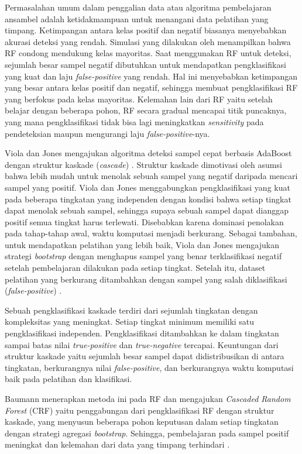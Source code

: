 Permasalahan umum dalam penggalian data atau algoritma pembelajaran ansambel
adalah ketidakmampuan untuk menangani data pelatihan yang timpang.
Ketimpangan antara kelas positif dan negatif biasanya menyebabkan akurasi
deteksi yang rendah.
Simulasi yang dilakukan oleh \textcite{strobl2007bias} menampilkan
bahwa RF condong mendukung kelas mayoritas.
Saat menggunakan RF untuk deteksi, sejumlah besar sampel negatif dibutuhkan
untuk mendapatkan pengklasifikasi yang kuat dan laju \textit{false-positive}
yang rendah.
Hal ini menyebabkan ketimpangan yang besar antara kelas positif dan
negatif, sehingga membuat pengklasifikasi RF yang berfokus pada kelas
mayoritas.
Kelemahan lain dari RF yaitu setelah belajar dengan beberapa pohon, RF secara
gradual mencapai titik puncaknya, yang mana pengklasifikasi tidak bisa lagi
meningkatkan \textit{sensitivity} pada pendeteksian maupun mengurangi laju
\textit{false-positive}-nya.

Viola dan Jones mengajukan algoritma deteksi sampel cepat
berbasis AdaBoost dengan struktur kaskade (\textit{cascade})
\parencite{viola2004robust}.
Struktur kaskade dimotivasi oleh asumsi bahwa lebih mudah untuk menolak sebuah
sampel yang negatif daripada mencari sampel yang positif.
Viola dan Jones menggabungkan pengklasifikasi yang kuat pada beberapa tingkatan
yang independen dengan kondisi bahwa setiap tingkat dapat menolak sebuah
sampel, sehingga supaya sebuah sampel dapat dianggap positif semua tingkat
harus terlewati.
Disebabkan karena dominasi penolakan pada tahap-tahap awal, waktu komputasi
menjadi berkurang.
Sebagai tambahan, untuk mendapatkan pelatihan yang lebih baik, Viola dan Jones
mengajukan strategi \textit{bootstrap} dengan menghapus sampel yang benar
terklasifikasi negatif setelah pembelajaran dilakukan pada setiap tingkat.
Setelah itu, dataset pelatihan yang berkurang ditambahkan dengan sampel yang
salah diklasifikasi (\textit{false-positive})
\parencite{viola2004robust}.

Sebuah pengklasifikasi kaskade terdiri dari sejumlah tingkatan dengan
kompleksitas yang meningkat.
Setiap tingkat minimum memiliki satu pengklasifikasi independen.
Pengklasifikasi ditambahkan ke dalam tingkatan sampai batas nilai
\textit{true-positive} dan \textit{true-negative} tercapai.
Keuntungan dari struktur kaskade yaitu sejumlah besar sampel dapat
didistribusikan di antara tingkatan, berkurangnya nilai \textit{false-positive},
dan berkurangnya waktu komputasi baik pada pelatihan dan klasifikasi.

Baumann menerapkan metoda ini pada RF dan mengajukan \textit{Cascaded Random
Forest} (CRF) yaitu penggabungan dari pengklasifikasi RF dengan struktur
kaskade, yang menyusun beberapa pohon keputusan dalam setiap tingkatan dengan
strategi agregasi \textit{bootstrap}.
Sehingga, pembelajaran pada sampel positif meningkat dan kelemahan dari data
yang timpang terhindari \parencite{baumann2013cascaded}.

